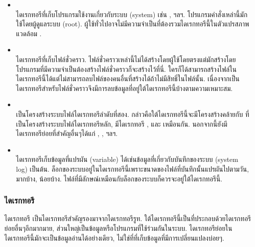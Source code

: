 \begin{thwbr}
\begin{itemize}
\item {}\\
ไดเรกทอรีที่เก็บโปรแกรมใช้งานเกี่ยวกับระบบ (system) เช่น ,  ฯลฯ. โปรแกรมคำสั่งเหล่านี้มักใช้โดยผู้ดูแลระบบ (root). ผู้ใช้ทั่วไปอาจไม่มีความจำเป็นที่ต้องรวมไดเรกทอรีนี้ในตัวแปรสภาพแวดล้อม .
\item {}\\
ไดเรกทอรีที่เก็บไฟล์ชั่วคราว. ไฟล์ชั่วคราวเหล่านี้ไม่ได้สร้างโดยผู้ใช้โดยตรงแต่มักสร้างโดยโปรแกรมที่มีความจำเป็นต้องสร้างไฟล์ชั่วคราวก็จะสร้างไว้ที่นี่. ใครก็ได้สามารถสร้างไฟล์ในไดเรกทอรีนี้ได้แต่ไม่สามารถลบไฟล์ของคนอื่นที่สร้างได้ถ้าไม่มีสิทธิ์ในไฟล์นั้น. เนื่องจากเป็นไดเรกทอรีสำหรับไฟล์ชั่วคราวจึงมีการลบข้อมูลที่อยู่ใต้ไดเรกทอรีนี้บ้างตามความเหมาะสม.
\item {}\\
เป็นโครงสร้างระบบไฟล์ไดเรกทอรีลำดับที่สอง. กล่าวคือใต้ไดเรกทอรีนี้จะมีโครงสร้างคล้ายกับ \cmd{/} ที่เป็นโครงสร้างระบบไฟล์ไดเรกทอรีหลัก, มีไดเรกทอรี ,  และ  เหมือนกัน. นอกจากนี้ยังมีไดเรกทอรีย่อยที่สำคัญอื่นๆได้แก่ , ,  ฯลฯ.
\item {}\\
ไดเรกทอรีเก็บข้อมูลที่แปรผัน (variable) ได้เช่นข้อมูลที่เกี่ยวกับบันทึกของระบบ (system log) เป็นต้น. ล็อกของระบบอยู่ในไดเรกทอรีนี้เพราะขนาดของไฟล์ที่บันทึกนั้นแปรผันไปตามวัน, มากบ้าง, น้อยบ้าง. ไฟล์ที่มีลักษณ์เหมือนกับล็อกของระบบก็ควรจะอยู่ใต้ไดเรกทอรีนี้.
\end{itemize}

\subsubsection{ไดเรกทอรี }
ไดเรกทอรี  เป็นไดเรกทอรีสำคัญรองมาจากไดเรกทอรีรูท. ใต้ไดเรกทอรีนี้เป็นที่ประกอบด้วยไดเรกทอรีย่อยอื่นๆอีกมากมาย, ส่วนใหญ่เป็นข้อมูลหรือโปรแกรมที่ใช้ร่วมกันในระบบ. ไดเรกทอรีย่อยในไดเรกทอรีนี้มักจะเป็นข้อมูลอ่านได้อย่างเดียว, ไม่ใช่ที่ที่เก็บข้อมูลที่มีการเปลี่ยนแปลงบ่อยๆ.


\end{thwbr}
